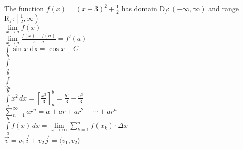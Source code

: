 \documentclass[11pt, letterpaper]{article}
\begin{document}
The function $f(x)=(x-3)^2+ \frac{1}{2}$ has domain $\mathrm{D}_f:(-\infty,\infty)$ and range $\mathrm{R}_f:\left [\frac{1}{2}, \infty \right )$\\
$\lim\limits_{x \to a} f(x)$\\
$\displaystyle{\lim\limits_{x \to a}\frac{f(x) - f(a)}{x-a} = f'(a)}$\\
$\displaystyle{\int \sin x \,\, \mathrm{dx} = \cos x+C}$\\

$\int \limits_a^b$\\
$\int \limits_{2a}^b$\\
$\displaystyle{\int \limits_a^b x^2\, dx = \left [\frac{x^3}{3} \right ]_a^b} = \frac{b^3}{3} - \frac{a^3}{3}$\\

$\displaystyle{\sum\limits_{n=1}^{\infty}} ar^n = a + ar +ar^2 +\cdots +ar^n$\\

$\displaystyle{\int \limits_a^b f(x) \, dx = \lim\limits_{x \to \infty}\sum\limits_{k=1}^n f(x_k)\cdot \Delta x}$\\

$\vec{v} = v_1 \vec{i} + v_2 \vec{j} = \langle v_1, v_2 \rangle$
\end{document}
